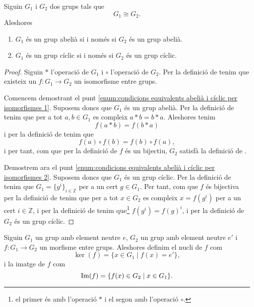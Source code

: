 \documentclass[../../Main.tex]{subfiles}
\begin{document}
	\begin{proposition}
		\label{prop:condicions equivalents abelià i cíclic per isomorfismes}
		Siguin \(G_{1}\) i \(G_{2}\) dos grups tals que
		\[G_{1}\cong G_{2}.\]
		Aleshores
		\begin{enumerate}
			\item\label{enum:condicions equivalents abelià i cíclic per isomorfismes 1} \(G_{1}\) és un grup abelià si i només si \(G_{2}\) és un grup abelià.
			\item\label{enum:condicions equivalents abelià i cíclic per isomorfismes 2} \(G_{1}\) és un grup cíclic si i només si \(G_{2}\) és un grup cíclic.
		\end{enumerate}
		\begin{proof}
			Siguin \(\ast\) l'operació de \(G_{1}\) i \(\circ\) l'operació de \(G_{2}\). Per la definició de  tenim que existeix un \(f\colon G_{1}\to G_{2}\) un isomorfisme entre grups.
			
			Comencem demostrant el punt \eqref{enum:condicions equivalents abelià i cíclic per isomorfismes 1}. Suposem doncs que \(G_{1}\) és un grup abelià. Per la definició de  tenim que per a tot \(a,b\in G_{1}\) es compleix \(a\ast b=b\ast a\). Aleshores tenim
			\[f(a\ast b)=f(b\ast a)\]
			i per la definició de  tenim que
			\[f(a)\circ f(b)=f(b)\circ f(a),\]
			i per tant, com que per la definició de  \(f\) és un bijectiu, \(G_{2}\) satisfà la definició de .
			
			Demostrem ara el punt \eqref{enum:condicions equivalents abelià i cíclic per isomorfismes 2}. Suposem doncs que \(G_{1}\) és un grup cíclic. Per la definició de  tenim que \(G_{1}=\{g^{i}\}_{i\in\mathbb{Z}}\) per a un cert \(g\in G_{1}\). Per tant, com que \(f\) és bijectiva per la definició de  tenim que per a tot \(x\in G_{2}\) es compleix \(x=f(g^{i})\) per a un cert \(i\in\mathbb{Z}\), i per la definició de  tenim que\footnote{el primer és amb l'operació \(\ast\) i el segon amb l'operació \(\circ\).} \(f(g^{i})=f(g)^{i}\), i per la definició de  \(G_{2}\) és un grup cíclic.
		\end{proof}
	\end{proposition}
	\begin{definition}
		\label{def:nucli d'un morfisme entre grups}
		\label{def:imatge d'un morfisme entre grups}
		Siguin \(G_{1}\) un grup amb element neutre \(e\), \(G_{2}\) un grup amb  element neutre \(e'\) i \(f\colon G_{1}\to G_{2}\) un morfisme entre grups. Aleshores definim el nucli de \(f\) com
		\[\ker(f)=\{x\in G_{1}\mid f(x)=e'\},\]
		i la imatge de \(f\) com
		\[\operatorname{Im}(f)=\{f(x)\in G_{2}\mid x\in G_{1}\}.\]
	\end{definition}
\end{document}
